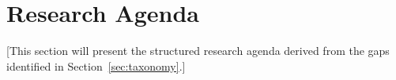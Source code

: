 \documentclass[acmsmall,screen,review]{acmart}
\begin{document}
\section{Research Agenda}
\label{sec:agenda}

[This section will present the structured research agenda derived from
the gaps identified in Section~\ref{sec:taxonomy}.]



\end{document}
